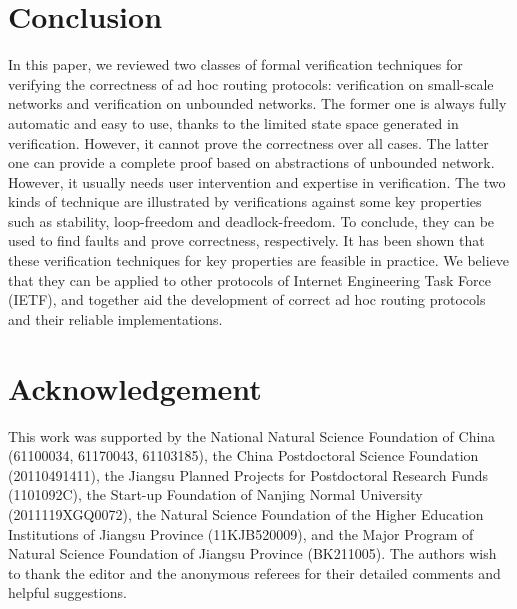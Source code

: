\documentclass[a4paper,10pt,twocolumn]{article}
\begin{document}
\section{Conclusion}
\label{Sec:conc}
In this paper, we reviewed two classes of formal verification techniques for verifying the correctness of ad hoc routing protocols: verification on small-scale networks and verification on unbounded networks. The former one is always fully automatic and easy to use, thanks to the limited state space generated in verification. However, it cannot prove the correctness over all cases. The latter one can provide a complete proof based on abstractions of unbounded network. However, it usually needs user intervention and expertise in verification. The two kinds of technique are illustrated by verifications against some key properties such as stability, loop-freedom and deadlock-freedom. To conclude, they can be used to find faults and prove correctness, respectively. It has been shown that these verification techniques for key properties are feasible in practice. We believe that they can be applied to other protocols of Internet Engineering Task Force (IETF), and together aid the development of correct ad hoc routing protocols and their reliable implementations.

\section*{Acknowledgement}
This work was supported by the National Natural Science Foundation of China (61100034, 61170043, 61103185), the China Postdoctoral Science Foundation (20110491411), the Jiangsu Planned Projects for Postdoctoral Research Funds (1101092C), the Start-up Foundation of Nanjing Normal University (2011119XGQ0072), the Natural Science Foundation of the Higher Education Institutions of Jiangsu Province (11KJB520009), and the Major Program of Natural Science Foundation of Jiangsu Province (BK211005). The authors wish to thank the editor and the anonymous referees for their detailed comments and helpful suggestions.



\end{document}
